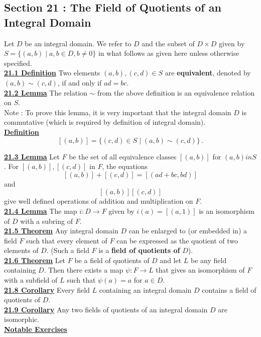 \documentclass[12pt, letterpaper]{article}
\begin{document}
\subsection{Section 21 : The Field of Quotients of an Integral Domain}

Let $D$ be an integral domain. We refer to $D$ and the subset of $D \times D$ given by $S = \{(a,b) \; | \; a,b \in D, b \neq 0\}$ in what follows as given here unless otherwise specified. \\

\noindent \underline{\bf 21.1 Definition} Two elements $(a,b), (c,d) \in S$ are {\bf equivalent}, denoted by $(a,b) \sim (c,d)$, if and only if $ad = bc$. \\

\noindent \underline{\bf 21.2 Lemma} The relation $\sim$ from the above definition is an equivalence relation on $S$. \\

Note : To prove this lemma, it is very important that the integral domain $D$ is commutative (which is required by definition of integral domain). \\

\noindent \underline{\bf Definition} $$[(a,b)] = \{(c,d) \in S \; | \; (a,b) \sim (c,d)\}\,.$$

\noindent \underline{\bf 21.3 Lemma} Let $F$ be the set of all equivalence classes $[(a,b)]$ for $(a,b) in S$. For $[(a,b)], [(c,d)]$ in $F$, the equations $$[(a,b)] + [(c,d)] = [(ad+bc,bd)]$$ and $$[(a,b)][(c,d)]$$ give well defined operations of addition and multiplication on $F$. \\

\noindent \underline{\bf 21.4 Lemma} The map $i : D \rightarrow F$ given by $i(a) = [(a,1)]$ is an isomorphism of $D$ with a subring of $F$. \\

\noindent \underline{\bf 21.5 Theorem} Any integral domain $D$ can be enlarged to (or embedded in) a field $F$ such that every element of $F$ can be expressed as the quotient of two elements of $D$. (Such a field $F$ is a {\bf field of quotients of} $D$). \\

\noindent \underline{\bf 21.6 Theorem} Let $F$ be a field of quotients of $D$ and let $L$ be any field containing $D$. Then there exists a map $\psi : F \rightarrow L$ that gives an isomorphism of $F$ with a subfield of $L$ such that $\psi(a) = a$ for $a \in D$. \\

\noindent \underline{\bf 21.8 Corollary} Every field $L$ containing an integral domain $D$ contains a field of quotients of $D$.  \\

\noindent \underline{\bf 21.9 Corollary} Any two fields of quotients of an integral domain $D$ are isomorphic. \\

\noindent \underline{\bf Notable Exercises}
 
\end{document}
